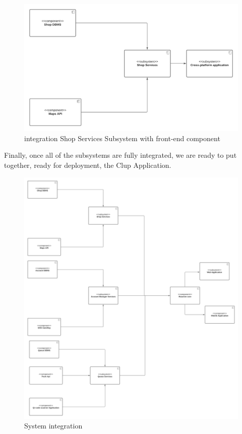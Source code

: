 \begin{figure}[h!]
    \centering
    \includegraphics[width=1\textwidth]{Images/TestDiagram/viewShop.png}
    \caption{\label{fig:viewAccount}{integration Shop Services Subsystem with front-end component}}
\end{figure}
\FloatBarrier 


Finally, once all of the subsystems are fully integrated, we are ready to put together, ready for deployment, the Clup Application.

\begin{figure}[h!]
    \centering
    \includegraphics[width=1\textwidth]{Images/TestDiagram/whole application.png}
    \caption{\label{fig:wholeapp}{System integration}}
\end{figure}
\FloatBarrier 






